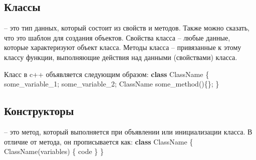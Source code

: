 \documentclass[a4paper,12pt]{article}
\begin{document}
\subsection*{Классы}

 -- это тип данных, который состоит из свойств и методов. Также можно сказать, что это шаблон для создания объектов. Свойства класса -- любые данные, которые характеризуют объект класса. Методы класса -- привязанные к этому классу функции, выполняющие действия над данными (свойствами) класса.

Класс в c++ объявляется следующим образом:
\vspace{6pt}\newline
\textbf{class} ClassName \{\newline
some\_variable\_1;\newline
some\_variable\_2;\newline
ClassName some\_method()\{\};\newline
\}

\subsection*{Конструкторы}

 -- это метод, который выполняется при объявлении или инициализации класса. В отличие от метода, он прописывается как:
\vspace{6pt}\newline
\textbf{class} ClassName \{\newline
ClassName(variables) \{\newline
code\newline
\}\newline
\}
\end{document}
